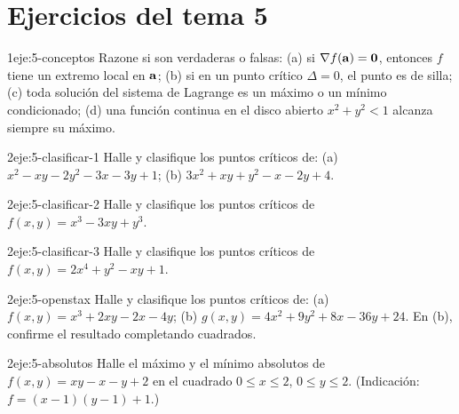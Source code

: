 \section*{Ejercicios del tema 5}

\begin{ejercicio}{1}{eje:5-conceptos}
Razone si son verdaderas o falsas: (a) si $\nabla f(\mathbf{a})=\mathbf{0}$, entonces $f$ tiene un extremo local en $\mathbf{a}$; (b) si en un punto crítico $\Delta=0$, el punto es de silla; (c) toda solución del sistema de Lagrange es un máximo o un mínimo condicionado; (d) una función continua en el disco abierto $x^2+y^2<1$ alcanza siempre su máximo.
\end{ejercicio}

\begin{ejercicio}{2}{eje:5-clasificar-1}
Halle y clasifique los puntos críticos de: (a) $x^2-xy-2y^2-3x-3y+1$; (b) $3x^2+xy+y^2-x-2y+4$.
\end{ejercicio}

\begin{ejercicio}{2}{eje:5-clasificar-2}
Halle y clasifique los puntos críticos de $f(x,y)=x^3-3xy+y^3$.
\end{ejercicio}

\begin{ejercicio}{2}{eje:5-clasificar-3}
Halle y clasifique los puntos críticos de $f(x,y)=2x^4+y^2-xy+1$.
\end{ejercicio}

\begin{ejercicio}{2}{eje:5-openstax}
Halle y clasifique los puntos críticos de: (a) $f(x,y)=x^3+2xy-2x-4y$; (b) $g(x,y)=4x^2+9y^2+8x-36y+24$. En (b), confirme el resultado completando cuadrados.
\end{ejercicio}

\begin{ejercicio}{2}{eje:5-absolutos}
Halle el máximo y el mínimo absolutos de $f(x,y)=xy-x-y+2$ en el cuadrado $0\le x\le2$, $0\le y\le2$. (Indicación: $f=(x-1)(y-1)+1$.)
\end{ejercicio}

